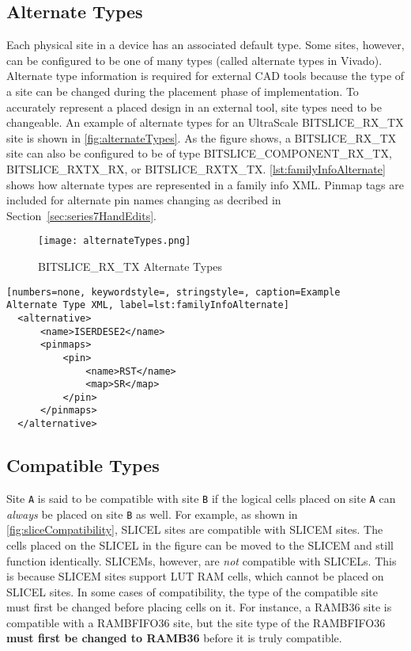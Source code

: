 \subsection{Alternate Types} \label{sec:alternateSites}
Each physical site in a device has an associated default type. Some sites,
however, can be configured to be one of many types (called alternate
types in Vivado). Alternate type information is required for external CAD tools because
the type of a site can be changed during the placement phase of implementation.
To accurately represent a placed design in an external tool, site types need to
be changeable. An example of alternate types for an UltraScale BITSLICE\_RX\_TX
site is shown in \autoref{fig:alternateTypes}. As the figure shows, a
BITSLICE\_RX\_TX site can also be configured to be of type
BITSLICE\_COMPONENT\_RX\_TX, BITSLICE\_RXTX\_RX, or BITSLICE\_RXTX\_TX.
\autoref{lst:familyInfoAlternate} shows how alternate types are
represented in a family info XML. Pinmap tags are included for alternate pin
names changing as decribed in Section~\ref{sec:series7HandEdits}.

\begin{figure}[b!]
  \centering
  \texttt{[image: alternateTypes.png]}
  \caption{BITSLICE\_RX\_TX Alternate Types}
  \label{fig:alternateTypes}
\end{figure}

\begin{lstlisting}[numbers=none, keywordstyle=, stringstyle=, caption=Example
Alternate Type XML, label=lst:familyInfoAlternate] 
  <alternative>
      <name>ISERDESE2</name>
      <pinmaps>
          <pin>
	          <name>RST</name>
              <map>SR</map>
	      </pin>
      </pinmaps>
  </alternative>
\end{lstlisting}

\subsection{Compatible Types}
Site \texttt{A} is said to be compatible with site \texttt{B} if the logical
cells placed on site \texttt{A} can \textit{always} be placed on site \texttt{B}
as well. For example, as shown in \autoref{fig:sliceCompatibility}, SLICEL sites
are compatible with SLICEM sites. The cells placed on the SLICEL in the figure
can be moved to the SLICEM and still function identically. SLICEMs, however,
are \textit{not} compatible with SLICELs. This is because SLICEM sites support
LUT RAM cells, which cannot be placed on SLICEL sites.  In some cases of
compatibility, the type of the compatible site must first be changed before
placing cells on it. For instance, a RAMB36 site is compatible with a
RAMBFIFO36 site, but the site type of the RAMBFIFO36 \textbf{must
first be changed to RAMB36} before it is truly compatible. 

